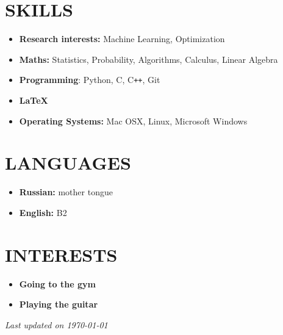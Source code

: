 \documentclass[12pt]{moderncv}
\begin{document}
    \section{SKILLS}
    
        \begin{itemize}
            \item \textbf{Research interests:} Machine Learning, Optimization
            \item \textbf{Maths:} Statistics, Probability, Algorithms, Calculus, Linear Algebra
            \item \textbf{Programming}: Python, C, C\texttt{++}, Git
            \item \textbf{\LaTeX}
            \item \textbf{Operating Systems:} Mac OSX, Linux, Microsoft Windows
        \end{itemize}

    \section{LANGUAGES}

        \begin{itemize}
            \item \textbf{Russian:} mother tongue
            \item \textbf{English:} B2
        \end{itemize}

    \section{INTERESTS}

        \begin{itemize}
            \item \textbf{Going to the gym}
            \item \textbf{Playing the guitar}
        \end{itemize}

    \emptysection{}\closesection{}
    \begin{center}
    \textit{Last updated on \today}
    \end{center}
\end{document}
